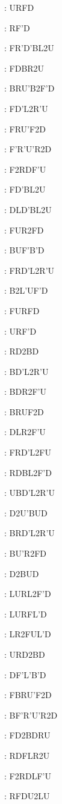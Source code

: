 \documentclass[9pt]{article}
\begin{document}
{\begin{multicols}{6}
: URFD

: RF'D

: FR'D'BL2U

: FDBR2U

: BRU'B2F'D

: FD'L2R'U

: FRU'F2D

: F'R'U'R2D

: F2RDF'U

: FD'BL2U

: DLD'BL2U

: FUR2FD

: BUF'B'D

: FRD'L2R'U

: B2L'UF'D

: FURFD

: URF'D

: RD2BD

: BD'L2R'U

: BDR2F'U

: BRUF2D

: DLR2F'U

: FRD'L2FU

: RDBL2F'D

: UBD'L2R'U

: D2U'BUD

: BRD'L2R'U

: BU'R2FD

: D2BUD

: LURL2F'D

: LURFL'D

: LR2FUL'D

: URD2BD

: DF'L'B'D

: FBRU'F2D

: BF'R'U'R2D

: FD2BDRU

: RDFLR2U

: F2RDLF'U

: RFDU2LU


\end{multicols}}
\end{document}
